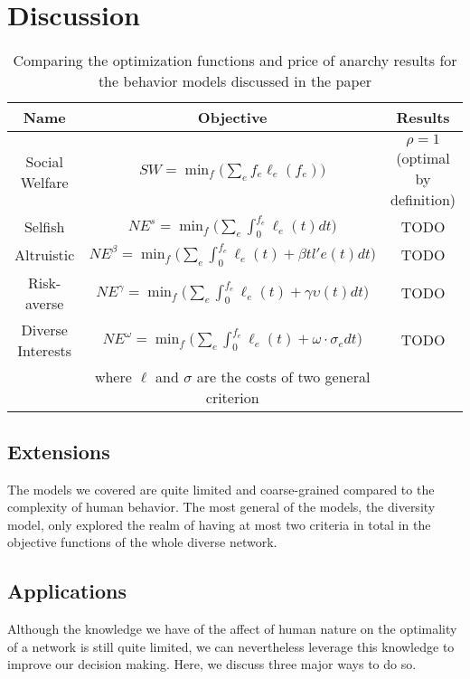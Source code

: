 \section{Discussion}\label{sec:discussion}

\begin{table}[h]
\begin{center}
 \begin{tabular}{|c | c | c|} 
 \hline
 Name & Objective & Results \\
 \hline\hline
     Social Welfare & $SW = \min_f\Big(\sum_e f_e\ell_e(f_e)\Big)$ & $\rho = 1$ (optimal by definition) \\
 \hline
     Selfish & $NE^s = \min_f\Big(\sum_e\int_0^{f_e} \ell_e(t)dt\Big)$ & TODO\\
 \hline
     Altruistic & $NE^\beta = \min_f\Big(\sum_e\int_0^{f_e} \ell_e(t) + \beta tl'e(t)dt\Big)$ & TODO\\
\hline
     Risk-averse & $NE^\gamma = \min_f\Big(\sum_e\int_0^{f_e} \ell_e(t) + \gamma\upsilon(t)dt\Big)$ & TODO\\
\hline
     Diverse Interests & $NE^\omega = \min_f\Big(\sum_e\int_0^{f_e} \ell_e(t) + \omega\cdot \sigma_e dt\Big)$ & TODO\\
     & where $\ell$ and $\sigma$ are the costs of two general criterion &\\
\hline
\end{tabular}
\end{center}
    \caption{Comparing the optimization functions and price of anarchy results for the behavior models discussed in the paper}
    \label{tab:comparison}
\end{table}

\subsection{Extensions}

The models we covered are quite limited and coarse-grained compared to the complexity of human behavior. The most general of the models, the diversity model, only explored the realm of having at most two criteria in total in the objective functions of the whole diverse network.

\subsection{Applications}
Although the knowledge we have of the affect of human nature on the optimality of a network is still quite limited, we can nevertheless leverage this knowledge to improve our decision making. Here, we discuss three major ways to do so.

